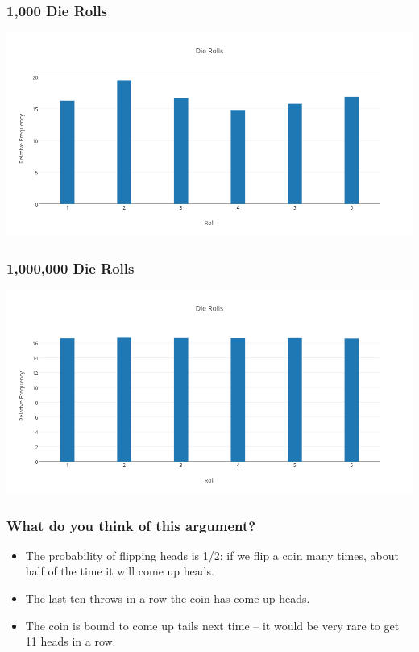 \documentclass{beamer}
\begin{document}
\begin{frame}
\frametitle{1,000 Die Rolls}
	\centering
	\includegraphics[scale = 0.3]{./images/die3.png}
\end{frame}

\begin{frame}
\frametitle{1,000,000 Die Rolls}
	\centering
	\includegraphics[scale = 0.3]{./images/die4.png}
\end{frame}

\begin{frame}
\frametitle{What do you think of this argument?}
	\begin{itemize}
		\item The probability of flipping heads is 1/2: if we flip a coin many times, about half of the 
		time it will come up heads.
		\item The last ten throws in a row the coin has come up heads.
		\item The coin is bound to come up tails next time -- it would be very rare to get 11 heads in a 
		row.
	\end{itemize}
\end{frame}
\end{document}
